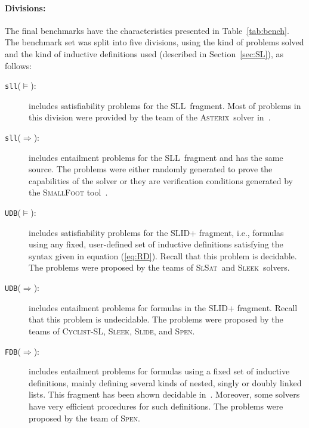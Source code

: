 \documentclass[twoside,11pt]{article}
\newcommand{\limp}{\Rightarrow}
\newcommand{\SLRD}{\textsc{SLID}}
\newcommand{\SLL}{\textsc{SLL}}
\newcommand{\sllsat}{\texttt{sll}($\models$)}
\newcommand{\sllent}{\texttt{sll}($\limp$)}
\newcommand{\FDBent}{\texttt{FDB}($\limp$)}
\newcommand{\UDBsat}{\texttt{UDB}($\models$)}
\newcommand{\UDBent}{\texttt{UDB}($\limp$)}
\newcommand{\ASTERIX}{\textsc{Asterix}}
\newcommand{\CYCLIST}{\textsc{Cyclist-SL}}
\newcommand{\SLEEK}{\textsc{Sleek}}
\newcommand{\SLIDE}{\textsc{Slide}}
\newcommand{\SLSAT}{\textsc{SlSat}}
\newcommand{\SPEN}{\textsc{Spen}}
\begin{document}
\paragraph{Divisions:} The final benchmarks have the characteristics presented in Table~\ref{tab:bench}.
The benchmark set was split into five divisions, using the kind of problems solved and the kind of inductive definitions used (described in Section~\ref{sec:SL}), as follows:
\begin{description}
\item[\sllsat:] includes satisfiability problems for the \SLL\ fragment.
Most of problems in this division were provided by the team of the \ASTERIX\ solver in~\cite{PerezR11}.

\item[\sllent:] includes entailment problems for the \SLL\ fragment and has the same source. The problems were either randomly generated to prove the capabilities of the solver or they are verification conditions generated by the \textsc{SmallFoot} tool~\cite{SmallFootsite}.

\item[\UDBsat:] includes satisfiability problems for the \SLRD+ fragment, i.e., formulas using any fixed, user-defined set of inductive definitions satisfying the syntax given in equation (\ref{eq:RD}).
Recall that this problem is decidable. 
The problems were proposed by the teams of \SLSAT\ and \SLEEK\ solvers.

\item[\UDBent:] includes entailment problems for formulas in the \SLRD+ fragment.
Recall that this problem is undecidable. 
The problems were proposed by the teams of \CYCLIST, \SLEEK, \SLIDE, and \SPEN.

\item[\FDBent:] includes entailment problems for formulas using a fixed set of inductive definitions, mainly defining several kinds of nested, singly or doubly linked lists. This fragment has been shown decidable in~\cite{AntonopoulosGHKO14,EneaLSV14}.
Moreover, some solvers have very efficient procedures for such definitions.
The problems were proposed by the team of \SPEN.
\end{description} 
 
\end{document}
